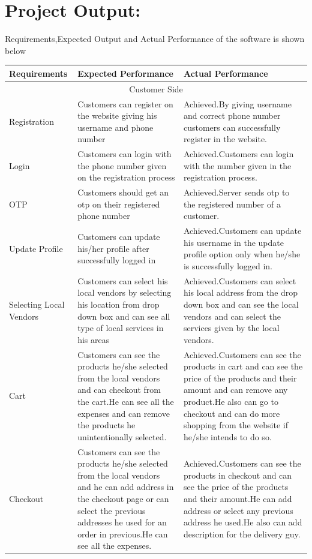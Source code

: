 \documentclass[13pt]{extarticle}
\begin{document}
\section{\textbf{Project Output:}}
\begin{center}
Requirements,Expected Output and Actual Performance of the software is shown below
\begin{longtable}{ |p{2.5cm}|p{4cm}| p{4cm}| }
\hline
Requirements& Expected Performance & Actual Performance\\
\hline
\multicolumn{3}{|c|}{Customer Side} \\
\hline
Registration & Customers can register on the website giving his username and phone number & Achieved.By giving username and correct phone number customers can successfully register in the website.\\
\hline
Login & Customers can login with the phone number given on the registration process & Achieved.Customers can login with the number given in the registration process.\\
\hline
OTP & Customers should get an otp on their registered phone number & Achieved.Server sends otp to the registered number of a customer.\\
\hline
Update Profile & Customers can update his/her profile after successfully logged in & Achieved.Customers can update his username in the update profile option only when he/she is successfully logged in.\\
\hline
Selecting Local Vendors & Customers can select his local vendors by selecting his location from drop down box and can see all type of local services in his areas & Achieved.Customers can select his local address from the drop down box and can see the local vendors and can select the services given by the local vendors.\\
 \endfirsthead
\hline
Cart & Customers can see the products he/she selected from the local vendors and can checkout from the cart.He can see all the expenses and can remove the products he unintentionally selected. & Achieved.Customers can see the products in cart and can see the price of the products and their amount and can remove any product.He also can go to checkout and can do more shopping from the website if he/she intends to do so.\\
\hline
Checkout & Customers can see the products he/she selected from the local vendors and he can add address in the checkout page or can select the previous addresses he used for an order in previous.He can see all the expenses. & Achieved.Customers can see the products in checkout and can see the price of the products and their amount.He can add address or select any previous address he used.He also can add description for the delivery guy.\\

\end{longtable}
\end{center}
\end{document}
